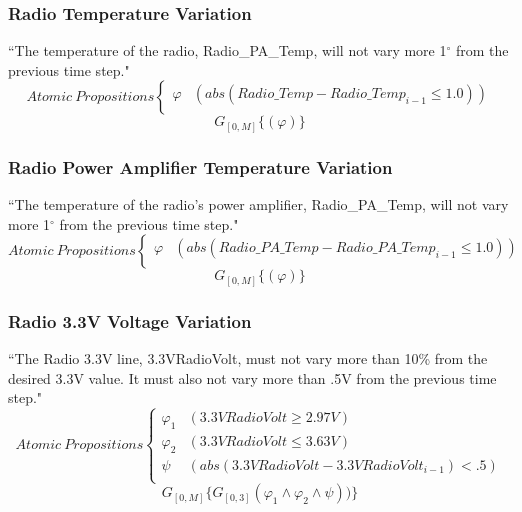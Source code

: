 \documentclass[conf]{new-aiaa}
\begin{document}
\subsubsection{\textbf{Radio Temperature Variation}}
“The temperature of the radio, Radio\_PA\_Temp, will not vary more 1$^{\circ}$ from the previous time step."
\[ Atomic\:Propositions \begin{cases}
  \varphi & (abs(Radio\_Temp - Radio\_Temp_{i-1} \leq 1.0)) \\
\end{cases} \]
\begin{equation}
    \label{Spec 5}
    G_{[0,M]} \{(\varphi)\}
\end{equation} 

\subsubsection{\textbf{Radio Power Amplifier Temperature Variation}}
“The temperature of the radio's power amplifier, Radio\_PA\_Temp, will not vary more 1$^{\circ}$ from the previous time step."
\[ Atomic\:Propositions \begin{cases}
  \varphi & (abs(Radio\_PA\_Temp - Radio\_PA\_Temp_{i-1} \leq 1.0)) \\
\end{cases} \]
\begin{equation}
    \label{Spec 6}
    G_{[0,M]} \{(\varphi)\}
\end{equation} 

\subsubsection{\textbf{Radio 3.3V Voltage Variation}}
“The Radio 3.3V line, 3.3VRadioVolt, must not vary more than 10\% from the desired 3.3V value. It must also not vary more than .5V from the previous time step."
\[ Atomic\:Propositions \begin{cases}
  \varphi_1 & (3.3VRadioVolt \geq 2.97V) \\
  \varphi_2 & (3.3VRadioVolt \leq 3.63V) \\
  \psi & (abs(3.3VRadioVolt - 3.3VRadioVolt_{i-1}) < .5)\\
\end{cases} \]
\begin{equation}
    \label{Spec 7}
    G_{[0,M]} \{G_{[0,3]}(\varphi_1 \wedge \varphi_2 \wedge \psi))\}
\end{equation} 
\end{document}
